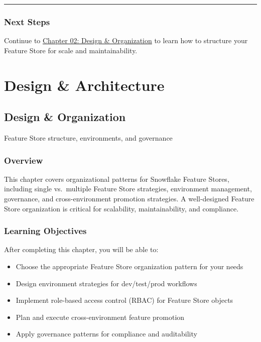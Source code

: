 \documentclass[
  letterpaper,
  DIV=11,
  numbers=noendperiod]{scrreprt}
\providecommand{\tightlist}{%
  \setlength{\itemsep}{0pt}\setlength{\parskip}{0pt}}\usepackage{longtable,booktabs,array}
\begin{document}
\begin{center}\rule{0.5\linewidth}{0.5pt}\end{center}

\hypertarget{next-steps-1}{%
\section{Next Steps}\label{next-steps-1}}

Continue to \protect\hyperlink{design-organization}{Chapter 02: Design
\& Organization} to learn how to structure your Feature Store for scale
and maintainability.

\part{Design \& Architecture}

\hypertarget{design-organization}{%
\chapter{Design \& Organization}\label{design-organization}}

Feature Store structure, environments, and governance

\hfill\break

\hypertarget{overview-2}{%
\section{Overview}\label{overview-2}}

This chapter covers organizational patterns for Snowflake Feature
Stores, including single vs.~multiple Feature Store strategies,
environment management, governance, and cross-environment promotion
strategies. A well-designed Feature Store organization is critical for
scalability, maintainability, and compliance.

\hypertarget{learning-objectives-1}{%
\section{Learning Objectives}\label{learning-objectives-1}}

After completing this chapter, you will be able to:

\begin{itemize}
\tightlist
\item
  Choose the appropriate Feature Store organization pattern for your
  needs
\item
  Design environment strategies for dev/test/prod workflows
\item
  Implement role-based access control (RBAC) for Feature Store objects
\item
  Plan and execute cross-environment feature promotion
\item
  Apply governance patterns for compliance and auditability
\end{itemize}
\end{document}
